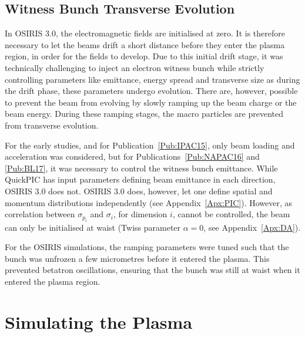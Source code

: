 \subsection{Witness Bunch Transverse Evolution}
\label{Sim:EBeam:TEvol}

In OSIRIS 3.0, the electromagnetic fields are initialised at zero.
It is therefore necessary to let the beams drift a short distance before they enter the plasma region, in order for the fields to develop.
Due to this initial drift stage, it was technically challenging to inject an electron witness bunch while strictly controlling parameters like emittance, energy spread and transverse size as during the drift phase, these parameters undergo evolution.
There are, however, possible to prevent the beam from evolving by slowly ramping up the beam charge or the beam energy.
During these ramping stages, the macro particles are prevented from transverse evolution.

For the early studies, and for Publication~\ref{Pub:IPAC15}, only beam loading and acceleration was considered, but for Publications~\ref{Pub:NAPAC16} and \ref{Pub:BL17}, it was necessary to control the witness bunch emittance.
While QuickPIC has input parameters defining beam emittance in each direction, OSIRIS 3.0 does not.
OSIRIS 3.0 does, however, let one define spatial and momentum distributions independently (see Appendix~\ref{Apx:PIC}).
However, as correlation between $\sigma_{p_{i}}$ and $\sigma_{i}$, for dimension $i$, cannot be controlled, the beam can only be initialised at waist (Twiss parameter $\alpha = 0$, see Appendix~\ref{Apx:DA}).

For the OSIRIS simulations, the ramping parameters were tuned such that the bunch was unfrozen a few micrometres before it entered the plasma.
This prevented betatron oscillations, ensuring that the bunch was still at waist when it entered the plasma region.

\section{Simulating the Plasma}
\label{Sim:Plasma}

